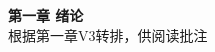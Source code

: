 

\frontmatter
\begin{center}
  {\Large\bfseries 第一章 绪论}\\[5pt]
  {\small 根据第一章V3转排，供阅读批注}
\end{center}
\tableofcontents
\mainmatter


